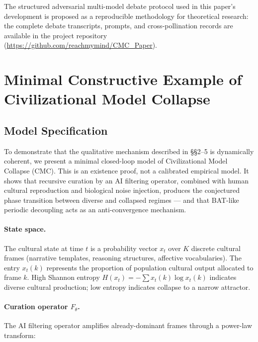 \documentclass[11pt, a4paper]{article}
\theoremstyle{remark}
\begin{document}
The structured adversarial multi-model debate protocol used in this paper's development is proposed as a reproducible methodology for theoretical research: the complete debate transcripts, prompts, and cross-pollination records are available in the project repository (\url{https://github.com/reachmymind/CMC_Paper}).


\nocite{*}


\appendix
\section{Minimal Constructive Example of Civilizational Model Collapse}
\label{sec:appendix-a}

\subsection{Model Specification}

To demonstrate that the qualitative mechanism described in \S\S2--5 is dynamically coherent, we present a minimal closed-loop model of Civilizational Model Collapse (CMC). This is an existence proof, not a calibrated empirical model. It shows that recursive curation by an AI filtering operator, combined with human cultural reproduction and biological noise injection, produces the conjectured phase transition between diverse and collapsed regimes --- and that BAT-like periodic decoupling acts as an anti-convergence mechanism.

\paragraph{State space.} The cultural state at time $t$ is a probability vector $x_t$ over $K$ discrete cultural frames (narrative templates, reasoning structures, affective vocabularies). The entry $x_t(k)$ represents the proportion of population cultural output allocated to frame $k$. High Shannon entropy $H(x_t) = -\sum x_t(k) \log x_t(k)$ indicates diverse cultural production; low entropy indicates collapse to a narrow attractor.

\paragraph{Curation operator $F_\theta$.} The AI filtering operator amplifies already-dominant frames through a power-law transform:
\end{document}
